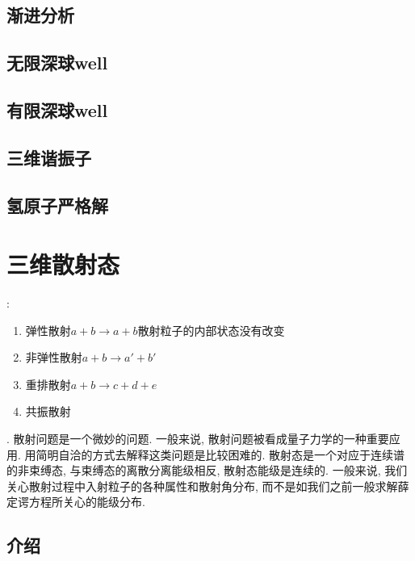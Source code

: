 \documentclass[a4paper,11pt]{book}
\begin{document}
\section{渐进分析}
\section{无限深球well}
\section{有限深球well}
\section{三维谐振子}
\section{氢原子严格解}
\chapter{三维散射态}
:
\begin{enumerate}
  \item 弹性散射$a+b\to a+b$散射粒子的内部状态没有改变
  \item 非弹性散射$a+b\to a'+b'$
  \item 重排散射$a+b\to c+d+e$
  \item 共振散射
\end{enumerate}

. 散射问题是一个微妙的问题. 一般来说, 散射问题被看成量子力学的一种重要应用. 用简明自洽的方式去解释这类问题是比较困难的. 散射态是一个对应于连续谱的非束缚态, 与束缚态的离散分离能级相反, 散射态能级是连续的. 一般来说, 我们关心散射过程中入射粒子的各种属性和散射角分布, 而不是如我们之前一般求解薛定谔方程所关心的能级分布.
\section{介绍}
\end{document}
